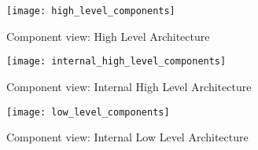 \begin{sidewaysfigure}
\centering
\texttt{[image: high\_level\_components]}
\caption{Component view: High Level Architecture}
\label{fig:h_l_comp}
\end{sidewaysfigure}


\begin{sidewaysfigure}
\centering
\texttt{[image: internal\_high\_level\_components]}
\caption{Component view: Internal High Level Architecture}
\label{fig:i_h_l_comp}
\end{sidewaysfigure}



\begin{sidewaysfigure}
\centering
\texttt{[image: low\_level\_components]}
\caption{Component view: Internal Low Level Architecture}
\label{fig:i_l_l_comp}
\end{sidewaysfigure}


